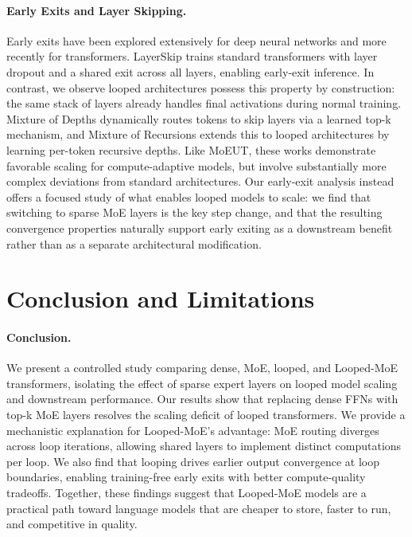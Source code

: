 \documentclass{article}
\begin{document}
\paragraph{Early Exits and Layer Skipping.} Early exits have been explored extensively for deep neural networks and more recently for transformers. LayerSkip \citep{elhoushi_layerskip_2024} trains standard transformers with layer dropout and a shared exit across all layers, enabling early-exit inference. In contrast, we observe looped architectures possess this property by construction: the same stack of layers already handles final activations during normal training. Mixture of Depths \citep{raposo_mixture--depths_2024} dynamically routes tokens to skip layers via a learned top-k mechanism, and Mixture of Recursions \citep{bae_mixture--recursions_2025} extends this to looped architectures by learning per-token recursive depths. Like MoEUT, these works demonstrate favorable scaling for compute-adaptive models, but involve substantially more complex deviations from standard architectures. Our early-exit analysis instead offers a focused study of what enables looped models to scale: we find that switching to sparse MoE layers is the key step change, and that the resulting convergence properties naturally support early exiting as a downstream benefit rather than as a separate architectural modification.

\section{Conclusion and Limitations}
\paragraph{Conclusion.} We present a controlled study comparing dense, MoE, looped, and Looped-MoE transformers, isolating the effect of sparse expert layers on looped model scaling and downstream performance. Our results show that replacing dense FFNs with top-k MoE layers resolves the scaling deficit of looped transformers. We provide a mechanistic explanation for Looped-MoE's advantage: MoE routing diverges across loop iterations, allowing shared layers to implement distinct computations per loop. We also find that looping drives earlier output convergence at loop boundaries, enabling training-free early exits with better compute-quality tradeoffs. Together, these findings suggest that Looped-MoE models are a practical path toward language models that are cheaper to store, faster to run, and competitive in quality.
\end{document}
